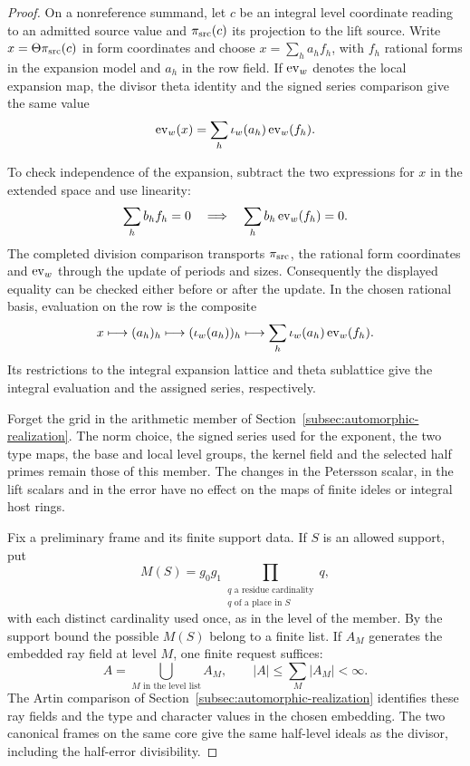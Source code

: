 \begin{proof}
On a nonreference summand, let \(c\) be an integral level coordinate
reading to an admitted source value and \(\pi_{\rm src}(c)\) its
projection to the lift source. Write \(x=\Theta\pi_{\rm src}(c)\)
in form coordinates and choose \(x=\sum_h a_h f_h\), with \(f_h\)
rational forms in the expansion model and \(a_h\) in the row field.
If \({\rm ev}_w\) denotes the local expansion map, the divisor theta
identity and the signed series comparison give the same value
\[
        {\rm ev}_w(x)=\sum_h\iota_w(a_h)\,{\rm ev}_w(f_h).
\]

To check independence of the expansion, subtract the two expressions for \(x\) in the extended space and use linearity:
\[
 \sum_h b_h f_h=0\quad\Longrightarrow\quad \sum_h b_h\,{\rm ev}_w(f_h)=0 .
\] The completed
division comparison transports \(\pi_{\rm src}\), the rational form
coordinates and \({\rm ev}_w\) through the update of periods and
sizes. Consequently the displayed equality can be checked either
before or after the update. In the chosen rational basis, evaluation on the row is the composite 
\[
 x\longmapsto(a_h)_h\longmapsto(\iota_w(a_h))_h\longmapsto\sum_h \iota_w(a_h)\,{\rm ev}_w(f_h).
\]
 Its restrictions to the integral expansion lattice and theta sublattice give the integral evaluation and the assigned series, respectively.
\label{cor:linked-family-rows-2}

Forget the grid in the arithmetic member of
Section~\ref{subsec:automorphic-realization}. The norm choice,
the signed series used for the exponent, the two type maps, the
base and local level groups, the kernel field and the selected
half primes remain those of this member. The changes in the
Petersson scalar, in the lift scalars and in the error have no
effect on the maps of finite ideles or integral host rings.

Fix a preliminary frame and its finite support data. If \(S\)
is an allowed support, put
\[
    M(S)=g_0g_1\!\!\prod_{\substack{q\text{ a residue cardinality}\\
                         q\text{ of a place in }S}}\!q ,
\]
with each distinct cardinality used once, as in the level of the
member. By the support bound the possible \(M(S)\) belong to a
finite list. If \(A_M\) generates the embedded ray field at level \(M\), one finite request suffices:
\[
 A=\bigcup_{M\text{ in the level list}} A_M,\qquad |A|\le\sum_M |A_M|<\infty .
\] The Artin comparison of
Section~\ref{subsec:automorphic-realization} identifies these ray
fields and the type and character values in the chosen embedding.
The two canonical frames on the same core give the same half-level
ideals as the divisor, including the half-error divisibility.


\end{proof}
